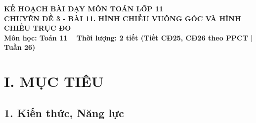 \documentclass[12pt, a4paper]{article}
\begin{document}
\begin{center}
    {\fontsize{14pt}{17pt}\selectfont \textbf{KẾ HOẠCH BÀI DẠY MÔN TOÁN LỚP 11}}\\[6pt]
    {\fontsize{16pt}{19pt}\selectfont \textbf{CHUYÊN ĐỀ 3 - BÀI 11. HÌNH CHIẾU VUÔNG GÓC VÀ HÌNH CHIẾU TRỤC ĐO}}\\[4pt]
    {\fontsize{12pt}{15pt}\selectfont \textbf{Môn học: Toán 11} \ \textbar \ \textbf{Thời lượng: 2 tiết (Tiết CĐ25, CĐ26 theo PPCT | Tuần 26)}}
\end{center}

\vspace{5pt}

\section*{I. MỤC TIÊU}

\subsection*{1. Kiến thức, Năng lực}
\end{document}
